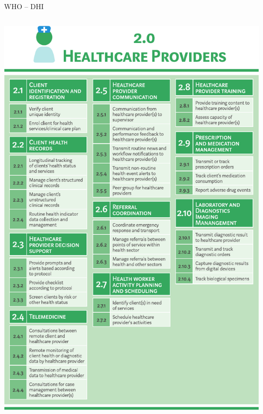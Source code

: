 \documentclass[aspectratio=1610,12pt]{beamer}
\begin{document}
\begin{frame}{WHO -- DHI}
\begin{columns}
  \vspace{0.5cm}
  \centering
  \includegraphics[height=.8\textheight]{img/whodhi-providers.pdf}
  \vspace{0.5cm}
  \centering

\end{columns}
\end{frame}
\end{document}
